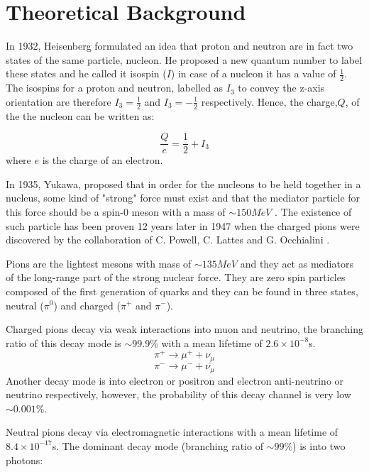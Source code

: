 \chapter{Theoretical Background}

\indent In 1932, Heisenberg formulated an idea that proton and neutron are in fact two states of the same particle, nucleon. He proposed a new quantum number to label these states and he called it isospin ($I$) in case of a nucleon it has a value of $\frac{1}{2}$. The isospins for a proton and neutron, labelled as $I_{3}$ to convey the z-axis orientation are therefore $I_{3}=\frac{1}{2}$ and $I_{3}=-\frac{1}{2}$ respectively. Hence, the charge,$Q$, of the the nucleon can be written as:

\begin{equation}
\frac{Q}{e}=\frac{1}{2}+I_{3}
\end{equation}
where $e$ is the charge of an electron.

\indent In 1935, Yukawa, proposed that in order for the nucleons to be held together in a nucleus, some kind of "strong" force must exist and that the mediator particle for this force should be a spin-0 meson with a mass of $\sim150MeV$ \cite{dudek}. The existence of such particle has been proven 12 years later in 1947 when the charged pions were discovered by the collaboration of C. Powell, C. Lattes and G. Occhialini \cite{martin}.

\indent Pions are the lightest mesons with mass of $\sim135MeV$ and they act as mediators of the long-range part of the strong nuclear force. They are zero spin particles composed of the first generation of quarks and they can be found in three states, neutral ($\pi^{0}$) and charged ($\pi^{+}$ and $\pi^{-}$).

\indent Charged pions decay via weak interactions into muon and neutrino, the branching ratio of this decay mode is $\sim99.9\%$ with a mean lifetime of $2.6 \times 10^{-8}$s.
\begin{equation}
\pi^{+} \rightarrow \mu^{+} + \nu_{\mu}
\end{equation}
\begin{equation}
\pi^{-} \rightarrow \mu^{-} + \bar{\nu_{\mu}}
\end{equation}
Another decay mode is into electron or positron and electron anti-neutrino or neutrino respectively, however, the probability of this decay channel is very low $\sim0.001\%$.

\indent Neutral pions decay via electromagnetic interactions with a mean lifetime of $8.4 \times 10^{-17}$s. The dominant decay mode (branching ratio of $\sim99\%$) is into two photons:

